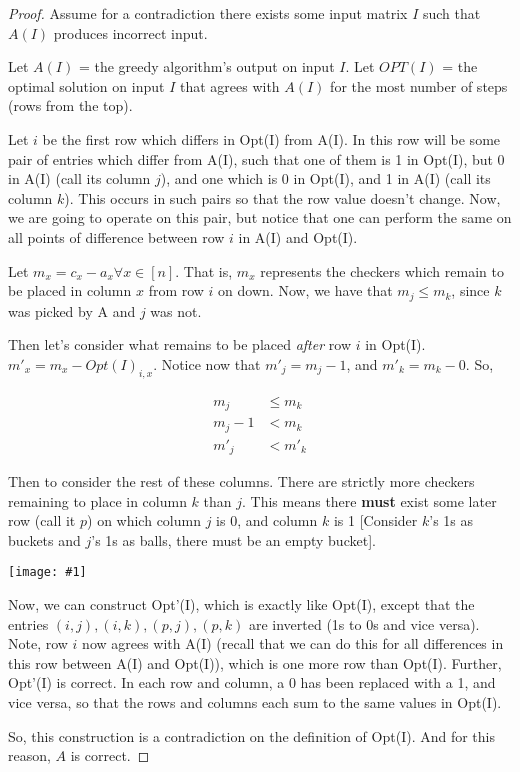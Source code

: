 \documentclass{article}
\providecommand{\image}[1]{
    \begin{center}
        \texttt{[image: \#1]}
    \end{center}
}
\begin{document}
	\begin{proof}
	Assume for a contradiction there exists some input matrix $I$ such that $A(I)$ produces incorrect input.

	Let $A(I)$ = the greedy algorithm's output on input $I$.
	Let $OPT(I)$ = the optimal solution on input $I$ that agrees
	with $A(I)$ for the most number of steps (rows from the top).

    Let $i$ be the first row which differs in Opt(I) from A(I).
    In this row will be some pair of entries which differ from A(I), such that one of them is 1 in Opt(I), but 0 in A(I) (call its column $j$), and one which is 0 in Opt(I), and 1 in A(I) (call its column $k$).
    This occurs in such pairs so that the row value doesn't change.
    Now, we are going to operate on this pair, but notice that one can perform the same on all points of difference between row $i$ in A(I) and Opt(I).

    Let $m_x = c_x - a_x \forall x \in [n]$. That is, $m_x$ represents the checkers which remain to be placed in column $x$ from row $i$ on down.
    Now, we have that $m_j \leq m_k$, since $k$ was picked by A and $j$ was not.

    Then let's consider what remains to be placed \textit{after} row $i$ in Opt(I).
    $m'_x = m_x - Opt(I)_{i, x}$.
    Notice now that $m'_j = m_j - 1$, and $m'_k = m_k - 0$. So,

    \begin{align*}
    m_j &\leq m_k\\
    m_j - 1 &< m_k\\
    m'_j &< m'_k
    \end{align*}

    Then to consider the rest of these columns.
    There are strictly more checkers remaining to place in column $k$ than $j$.
    This means there \textbf{must} exist some later row (call it $p$) on which column $j$ is 0, and column $k$ is 1 [Consider $k$'s 1s as buckets and $j$'s 1s as balls, there must be an empty bucket].

    \image{p12mat}

    Now, we can construct Opt'(I), which is exactly like Opt(I), except that the entries $(i, j), (i, k), (p, j), (p, k)$ are inverted (1s to 0s and vice versa).
    Note, row $i$ now agrees with A(I) (recall that we can do this for all differences in this row between A(I) and Opt(I)), which is one more row than Opt(I).
    Further, Opt'(I) is correct.
    In each row and column, a 0 has been replaced with a 1, and vice versa, so that the rows and columns each sum to the same values in Opt(I).

    So, this construction is a contradiction on the definition of Opt(I).
    And for this reason, $A$ is correct.
	\end{proof}
\end{document}
